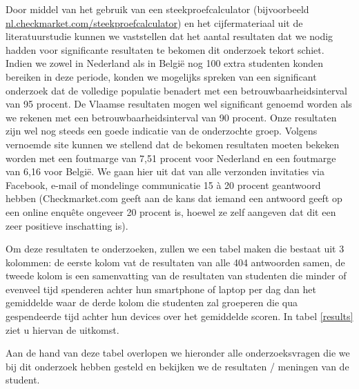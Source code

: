 Door middel van het gebruik van een steekproefcalculator (bijvoorbeeld \url{nl.checkmarket.com/steekproefcalculator}) en het cijfermateriaal uit de literatuurstudie kunnen we vaststellen dat het aantal resultaten dat we nodig hadden voor significante resultaten te bekomen dit onderzoek tekort schiet. Indien we zowel in Nederland als in België nog 100 extra studenten konden bereiken in deze periode, konden we mogelijks spreken van een significant onderzoek dat de volledige populatie benadert met een betrouwbaarheidsinterval van 95 procent. De Vlaamse resultaten mogen wel significant genoemd worden als we rekenen met een betrouwbaarheidsinterval van 90 procent. Onze resultaten zijn wel nog steeds een goede indicatie van de onderzochte groep. Volgens vernoemde site kunnen we stellend dat de bekomen resultaten moeten bekeken worden met een foutmarge van 7,51 procent voor Nederland en een foutmarge van 6,16 voor België. We gaan hier uit dat van alle verzonden invitaties via Facebook, e-mail of mondelinge communicatie 15 à 20 procent geantwoord hebben (Checkmarket.com geeft aan de kans dat iemand een antwoord geeft op een online enquête ongeveer 20 procent is, hoewel ze zelf aangeven dat dit een zeer positieve inschatting is).

Om deze resultaten te onderzoeken, zullen we een tabel maken die bestaat uit 3 kolommen: de eerste kolom vat de resultaten van alle 404 antwoorden samen, de tweede kolom is een samenvatting van de resultaten van studenten die minder of evenveel tijd spenderen achter hun smartphone of laptop per dag dan het gemiddelde waar de derde kolom die studenten zal groeperen die qua gespendeerde tijd achter hun devices over het gemiddelde scoren. In tabel \ref{results} ziet u hiervan de uitkomst.

Aan de hand van deze tabel overlopen we hieronder alle onderzoeksvragen die we bij dit onderzoek hebben gesteld en bekijken we de resultaten / meningen van de student.

